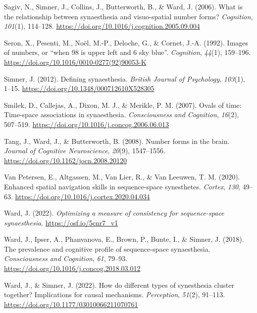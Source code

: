 \documentclass[
  man,
  floatsintext,
  longtable,
  nolmodern,
  notxfonts,
  notimes,
  colorlinks=true,linkcolor=blue,citecolor=blue,urlcolor=blue]{apa7}
\newlength{\cslhangindent}
\newenvironment{CSLReferences}[2] %
 {\begin{list}{}{%
  \setlength{\itemindent}{0pt}
  \setlength{\leftmargin}{0pt}
  \setlength{\parsep}{0pt}
  \ifodd #1
   \setlength{\leftmargin}{\cslhangindent}
   \setlength{\itemindent}{-1\cslhangindent}
  \fi
  \setlength{\itemsep}{#2\baselineskip}}}
 {\end{list}}
\begin{document}
\begin{CSLReferences}{1}{0}
Sagiv, N., Simner, J., Collins, J., Butterworth, B., \& Ward, J. (2006).
What is the relationship between synaesthesia and visuo-spatial number
forms? \emph{Cognition}, \emph{101}(1), 114--128.
\url{https://doi.org/10.1016/j.cognition.2005.09.004}

Seron, X., Pesenti, M., Noël, M.-P., Deloche, G., \& Cornet, J.-A.
(1992). Images of numbers, or {``}when 98 is upper left and 6 sky
blue{''}. \emph{Cognition}, \emph{44}(1), 159--196.
\url{https://doi.org/10.1016/0010-0277(92)90053-K}

Simner, J. (2012). Defining synaesthesia. \emph{British Journal of
Psychology}, \emph{103}(1), 1--15.
\url{https://doi.org/10.1348/000712610X528305}

Smilek, D., Callejas, A., Dixon, M. J., \& Merikle, P. M. (2007). Ovals
of time: Time-space associations in synaesthesia. \emph{Consciousness
and Cognition}, \emph{16}(2), 507--519.
\url{https://doi.org/10.1016/j.concog.2006.06.013}

Tang, J., Ward, J., \& Butterworth, B. (2008). Number forms in the
brain. \emph{Journal of Cognitive Neuroscience}, \emph{20}(9),
1547--1556. \url{https://doi.org/10.1162/jocn.2008.20120}

Van Petersen, E., Altgassen, M., Van Lier, R., \& Van Leeuwen, T. M.
(2020). Enhanced spatial navigation skills in sequence-space
synesthetes. \emph{Cortex}, \emph{130}, 49--63.
\url{https://doi.org/10.1016/j.cortex.2020.04.034}

Ward, J. (2022). \emph{Optimizing a measure of consistency for
sequence-space synaesthesia}. \url{https://osf.io/5cnr7_v1}

Ward, J., Ipser, A., Phanvanova, E., Brown, P., Bunte, I., \& Simner, J.
(2018). The prevalence and cognitive profile of sequence-space
synaesthesia. \emph{Consciousness and Cognition}, \emph{61}, 79--93.
\url{https://doi.org/10.1016/j.concog.2018.03.012}

Ward, J., \& Simner, J. (2022). How do different types of synesthesia
cluster together? Implications for causal mechanisms. \emph{Perception},
\emph{51}(2), 91--113. \url{https://doi.org/10.1177/03010066211070761}


\end{CSLReferences}
\end{document}
